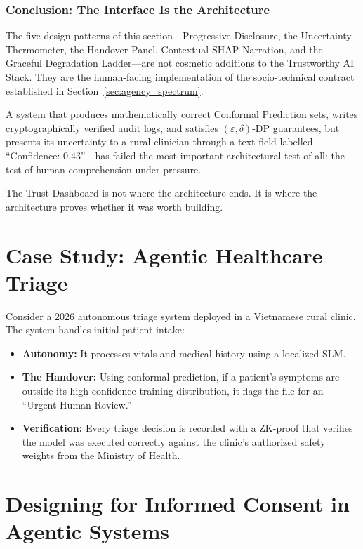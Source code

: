 \subsubsection{Conclusion: The Interface Is the Architecture}
\label{subsubsec:dashboard-conclusion}

The five design patterns of this section---Progressive Disclosure,
the Uncertainty Thermometer, the Handover Panel, Contextual SHAP
Narration, and the Graceful Degradation Ladder---are not cosmetic
additions to the Trustworthy AI Stack.
They are the human-facing implementation of the socio-technical
contract established in Section~\ref{sec:agency_spectrum}.

A system that produces mathematically correct Conformal Prediction
sets, writes cryptographically verified audit logs, and satisfies
$(\varepsilon, \delta)$-DP guarantees, but presents its uncertainty
to a rural clinician through a text field labelled
``Confidence: 0.43''---has failed the most important
architectural test of all: the test of human comprehension under
pressure.

The Trust Dashboard is not where the architecture ends.
It is where the architecture proves whether it was worth building.

\section{Case Study: Agentic Healthcare Triage}
\label{sec:healthcare_triage}

Consider a 2026 autonomous triage system deployed in a Vietnamese rural clinic. The system handles initial patient intake:
\begin{itemize}
    \item \textbf{Autonomy:} It processes vitals and medical history using a localized SLM.
    \item \textbf{The Handover:} Using conformal prediction, if a patient's symptoms are outside its high-confidence training distribution, it flags the file for an ``Urgent Human Review.''
    \item \textbf{Verification:} Every triage decision is recorded with a ZK-proof that verifies the model was executed correctly against the clinic's authorized safety weights from the Ministry of Health.
\end{itemize}

\section{Designing for Informed Consent in Agentic Systems}
\label{sec:informed_consent_ux}


